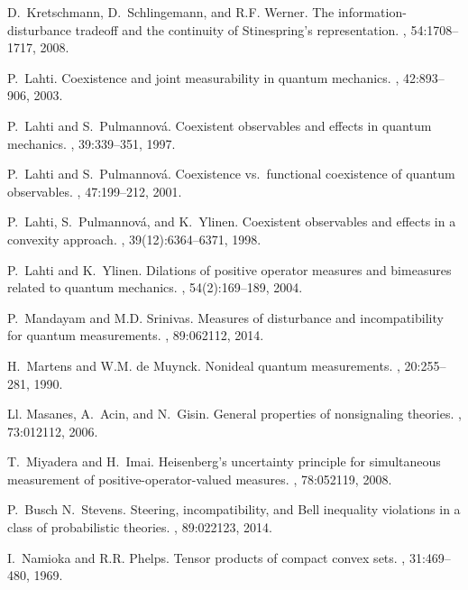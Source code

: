 \documentclass[12pt]{iopart}
\theoremstyle{definition}
\begin{document}
{\begin{thebibliography}{10}
D.~Kretschmann, D.~Schlingemann, and R.F. Werner.
\newblock The information-disturbance tradeoff and the continuity of
  {S}tinespring's representation.
, 54:1708--1717, 2008.

P.~Lahti.
\newblock Coexistence and joint measurability in quantum mechanics.
, 42:893--906, 2003.

P.~Lahti and S.~Pulmannov{\'a}.
\newblock Coexistent observables and effects in quantum mechanics.
, 39:339--351, 1997.

P.~Lahti and S.~Pulmannov{\'a}.
\newblock Coexistence vs.\ functional coexistence of quantum observables.
, 47:199--212, 2001.

P.~Lahti, S.~Pulmannov{\'a}, and K.~Ylinen.
\newblock Coexistent observables and effects in a convexity approach.
, 39(12):6364--6371, 1998.

P.~Lahti and K.~Ylinen.
\newblock Dilations of positive operator measures and bimeasures related to
  quantum mechanics.
, 54(2):169--189, 2004.

P.~Mandayam and M.D. Srinivas.
\newblock Measures of disturbance and incompatibility for quantum measurements.
, 89:062112, 2014.

H.~Martens and W.M. {de Muynck}.
\newblock Nonideal quantum measurements.
, 20:255--281, 1990.

Ll. Masanes, A.~Acin, and N.~Gisin.
\newblock General properties of nonsignaling theories.
, 73:012112, 2006.

T.~Miyadera and H.~Imai.
\newblock Heisenberg's uncertainty principle for simultaneous measurement of
  positive-operator-valued measures.
, 78:052119, 2008.

P.~Busch N.~Stevens.
\newblock Steering, incompatibility, and {B}ell inequality violations in a
  class of probabilistic theories.
, 89:022123, 2014.

I.~Namioka and R.R. Phelps.
\newblock Tensor products of compact convex sets.
, 31:469--480, 1969.


\end{thebibliography}}
\end{document}
